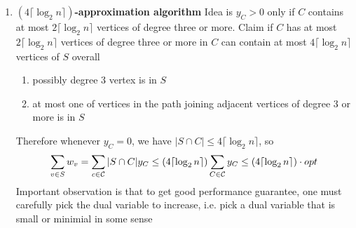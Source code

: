 \documentclass[11pt]{article}
\begin{document}
\begin{enumerate}
    \item \textbf{$(4\lceil \log_2 n \rceil)$-approximation algorithm} Idea is $y_C > 0$ only if $C$ contains at most $2\lceil \log_2 n \rceil$ vertices of degree three or more. Claim if $C$ has at most $2\lceil \log_2 n \rceil$ vertices of degree three or more in $C$ can contain at most $4\lceil \log_2 n \rceil$ vertices of $S$ overall
    \begin{enumerate}
        \item possibly degree 3 vertex is in $S$ 
        \item at most one of vertices in the path joining adjacent vertices of degree 3 or more is in $S$ 
    \end{enumerate}
    Therefore whenever $y_C = 0$, we have $|S\cap C| \leq 4\lceil \log_2 n \rceil$, so 
    \[
        \sum_{v\in S} w_v 
        = \sum_{c\in\mathcal{C}} |S\cap C| y_C
        \leq (4\lceil \log_2 n \rceil) \sum_{C\in\mathcal{C}}  y_C 
        \leq (4\lceil \log_2 n \rceil) \cdot opt
    \]
    Important observation is that to get good performance guarantee, one must carefully pick the dual variable to increase, i.e. pick a dual variable that is small or minimial in some sense
\end{enumerate}



 
\end{document}
